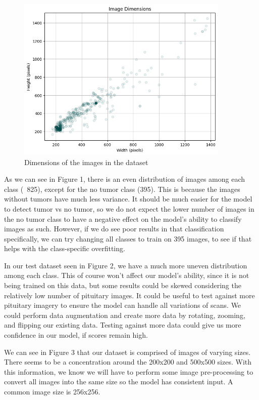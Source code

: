 \documentclass[conference]{IEEEtran}
\begin{document}
\begin{figure}[!ht]
    \centering
    \includegraphics[width=4in]{ImageDimensions.png}
    \caption{Dimensions of the images in the dataset}
    \label{Dimensions of images in the dataset}
\end{figure}

As we can see in Figure 1, there is an even distribution of images among each class (~825), except for the no tumor class (395). This is because the images without tumors have much less variance. It should be much easier for the model to detect tumor vs no tumor, so we do not expect the lower number of images in the no tumor class to have a negative effect on the model's ability to classify images as such. However, if we do see poor results in that classification specifically, we can try changing all classes to train on 395 images, to see if that helps with the class-specific overfitting.

In our test dataset seen in Figure 2, we have a much more uneven distribution among each class. This of course won't affect our model's ability, since it is not being trained on this data, but some results could be skewed considering the relatively low number of pituitary images. It could be useful to test against more pituitary imagery to ensure the model can handle all variations of scans. We could perform data augmentation and create more data by rotating, zooming, and flipping our existing data. Testing against more data could give us more confidence in our model, if scores remain high.

We can see in Figure 3 that our dataset is comprised of images of varying sizes. There seems to be a concentration around the 200x200 and 500x500 sizes. With this information, we know we will have to perform some image pre-processing to convert all images into the same size so the model has consistent input. A common image size is 256x256.
\end{document}
